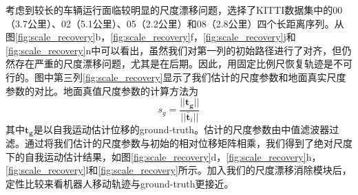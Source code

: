 考虑到较长的车辆运行面临较明显的尺度漂移问题，选择了KITTI数据集中的00（3.7公里）、02（5.1公里）、05（2.2公里）和08（2.8公里）四个长距离序列。从图\ref{fig:scale_recovery}b，\ref{fig:scale_recovery}f，\ref{fig:scale_recovery}j和\ref{fig:scale_recovery}n中可以看出，虽然我们对第一列的初始路径进行了对齐，但仍然存在严重的尺度漂移问题，尤其是在后期。因此，用固定比例尺恢复轨迹是不可行的。图中第三列\ref{fig:scale_recovery}显示了我们估计的尺度参数和地面真实尺度参数的对比。地面真值尺度参数的计算方法为
\begin{equation}
    s_g = \frac{||\mathbf{t_g}||}{||\mathbf{\bar{t}}_i||}
\end{equation}
其中$\mathbf{t_g}$是以自我运动估计位移的ground-truth。估计的尺度参数由中值滤波器过滤。通过将我们估计的尺度参数与初始的相对位移矩阵相乘，我们得到了绝对尺度下的自我运动估计结果，如图\ref{fig:scale_recovery}d，\ref{fig:scale_recovery}h，\ref{fig:scale_recovery}l和\ref{fig:scale_recovery}所示。加入我们的尺度漂移消除模块后，定性比较来看机器人移动轨迹与ground-truth更接近。

